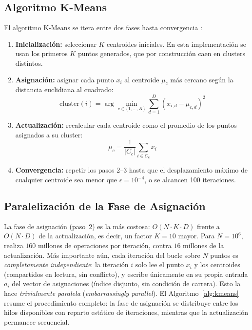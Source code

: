 \documentclass[conference]{IEEEtran}
\begin{document}
\subsection{Algoritmo K-Means}

El algoritmo K-Means se itera entre dos fases hasta convergencia
\cite{macqueen1967}:

\begin{enumerate}
  \item \textbf{Inicializaci\'on:} seleccionar $K$ centroides iniciales.
        En esta implementaci\'on se usan los primeros $K$ puntos generados,
        que por construcci\'on caen en clusters distintos.
  \item \textbf{Asignaci\'on:} asignar cada punto $x_i$ al centroide
        $\mu_c$ m\'as cercano seg\'un la distancia euclidiana al cuadrado:
        \begin{equation}
          \text{cluster}(i) = \arg\min_{c \in \{1,\ldots,K\}}
          \sum_{d=1}^{D}(x_{i,d} - \mu_{c,d})^2
        \end{equation}
  \item \textbf{Actualizaci\'on:} recalcular cada centroide como el promedio
        de los puntos asignados a su cluster:
        \begin{equation}
          \mu_c = \frac{1}{|C_c|}\sum_{i \in C_c} x_i
        \end{equation}
  \item \textbf{Convergencia:} repetir los pasos 2--3 hasta que el
        desplazamiento m\'aximo de cualquier centroide sea menor que
        $\epsilon = 10^{-4}$, o se alcancen 100 iteraciones.
\end{enumerate}

\subsection{Paralelizaci\'on de la Fase de Asignaci\'on}

La fase de asignaci\'on (paso~2) es la m\'as costosa: $O(N \cdot K \cdot D)$
frente a $O(N \cdot D)$ de la actualizaci\'on, es decir, un factor $K{=}10$
mayor.
Para $N{=}10^6$, realiza $160$ millones de operaciones por iteraci\'on, contra
$16$ millones de la actualizaci\'on.
M\'as importante a\'un, cada iteraci\'on del bucle sobre $N$ puntos es
\emph{completamente independiente}: la iteraci\'on $i$ solo lee el punto $x_i$
y los centroides (compartidos en lectura, sin conflicto), y escribe
\'unicamente en su propia entrada $a_i$ del vector de asignaciones (\'indice
disjunto, sin condici\'on de carrera).
Esto la hace \emph{trivialmente paralela} (\emph{embarrassingly parallel}).
El Algoritmo~\ref{alg:kmeans} resume el procedimiento completo: la fase de
asignaci\'on se distribuye entre los hilos disponibles con reparto est\'atico
de iteraciones, mientras que la actualizaci\'on permanece secuencial.
\end{document}
